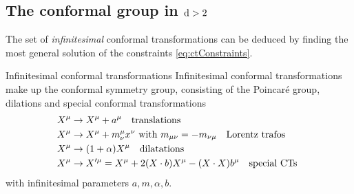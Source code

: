 \subsection[The conformal group in greater or equal to three dimensions]{The conformal group in $\mathrm{d}>2$}
The set of \emph{infinitesimal} conformal transformations can be deduced by finding the most general solution of the constraints \ref{eq:ctConstraints}.
\begin{mybox}{Infinitesimal conformal transformations}
Infinitesimal conformal transformations make up the conformal symmetry group, consisting of the Poincaré group, dilations and special conformal transformations
\begin{align}
	&X^\mu \rightarrow X^\mu + a^\mu \quad \text{translations} \\
	&X^\mu \rightarrow X^\mu + m^\mu_\nu x^\nu \text{ with }m_{\mu \nu}=-m_{\nu \mu} \quad \text{Lorentz trafos}\\
	&X^\mu \rightarrow (1+\alpha) X^\mu \quad \text{dilatations} \\
	&X^\mu \rightarrow X^{\prime \mu}= X^\mu + 2 (X\cdot b) X^\mu - (X\cdot X) b^\mu \quad \text{special CTs } 
\end{align}
with infinitesimal parameters $a,m, \alpha,b$.
\end{mybox}
